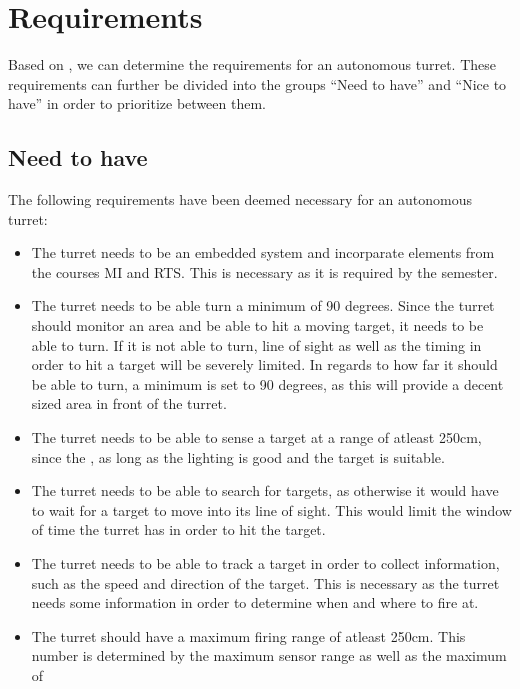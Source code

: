 \section{Requirements}

Based on , we can determine the requirements for an autonomous turret.
These requirements can further be divided into the groups ``Need to have'' and
``Nice to have'' in order to prioritize between them.

\subsection{Need to have}
The following requirements have been deemed necessary for an autonomous turret:
\begin{itemize}
  \item The turret needs to be an embedded system and incorparate elements from
  the courses MI and RTS. This is necessary as it is required by the semester.
  \item The turret needs to be able turn a minimum of 90 degrees. Since the
  turret should monitor an area and be able to hit a moving target, it needs to
  be able to turn. If it is not able to turn, line of sight as well as the
  timing in order to hit a target will be severely limited. In regards to how
  far it should be able to turn, a minimum is set to 90 degrees, as this will
  provide a decent sized area in front of the turret.
  \item The turret needs to be able to sense a target at a range of atleast
  250cm, since the , as long as the
  lighting is good and the target is suitable.
  \item The turret needs to be able to search for targets, as otherwise it would
  have to wait for a target to move into its line of sight. This would limit
  the window of time the turret has in order to hit the target.
  \item The turret needs to be able to track a target in order to collect
  information, such as the speed and direction of the target. This is necessary
  as the turret needs some information in order to determine when and where to
  fire at.
  \item The turret should have a maximum firing range of atleast 250cm. This
  number is determined by the maximum sensor range as well as the maximum of

\end{itemize}

